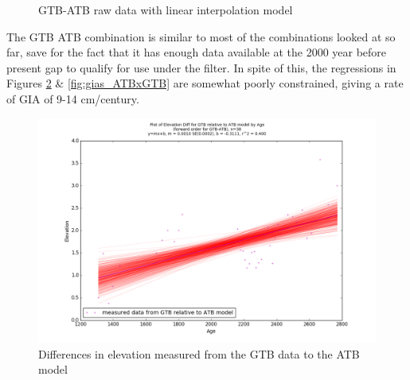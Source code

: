 \begin{figure}[h]
	\caption{GTB-ATB raw data with linear interpolation model}
	\label{fig:data_GTBxATB}
\end{figure}

The GTB ATB combination is similar to most of the combinations looked at so far,
save for the fact that it has enough data available at the 2000 year before 
present gap to qualify for use under the filter. In spite of this, the
regressions in Figures \ref{fig:gias_GTBxATB} \& \ref{fig:gias_ATBxGTB} are
somewhat poorly constrained, giving a rate of GIA of 9-14 cm/century.
\newpage

\begin{figure}[h]
	\includegraphics[width=0.9\linewidth]{data/bothNonZero/withinSeventyFivePercent/gias/theGIA_GTB_relative_to_ATB.png}
	\caption{Differences in elevation measured from the GTB data to the ATB model}
	\label{fig:gias_GTBxATB}
\end{figure}
\newpage


